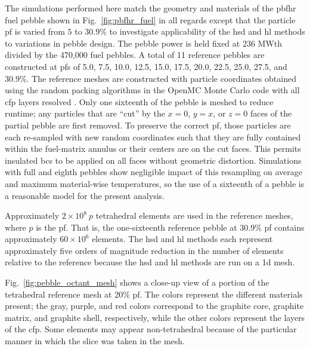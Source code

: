 The simulations performed here match the geometry and materials of the \gls{pbfhr} fuel pebble shown in Fig.\ \ref{fig:pbfhr_fuel} in all regards except that the particle \gls{pf} is varied from \(5\) to \(30.9\)\% to investigate applicability of the \gls{hsd} and \gls{hl} methods to variations in pebble design. The pebble power is held fixed at 236 MWth divided by the 470,000 fuel pebbles. A total of 11 reference pebbles are constructed at \glspl{pf} of 5.0, 7.5, 10.0, 12.5, 15.0, 17.5, 20.0, 22.5, 25.0, 27.5, and 30.9\%. The reference meshes are constructed with particle coordinates obtained using the random packing algorithms in the OpenMC Monte Carlo code with all \gls{cfp} layers resolved \cite{jodrey}. Only one sixteenth of the pebble is meshed to reduce runtime; any particles that are ``cut'' by the \(x=0\), \(y=x\), or \(z=0\) faces of the partial pebble are first removed. To preserve the correct \gls{pf}, those particles are each re-sampled with new random coordinates such that they are fully contained within the fuel-matrix annulus or their centers are on the cut faces. This permits insulated \glspl{bc} to be applied on all faces without geometric distortion. Simulations with full and eighth pebbles show negligible impact of this resampling on average and maximum material-wise temperatures, so the use of a sixteenth of a pebble is a reasonable model for the present analysis. 

Approximately \(2\times10^8\ p\) tetrahedral elements are used in the reference meshes, where \(p\) is the \gls{pf}. That is, the one-sixteenth reference pebble at 30.9\% \gls{pf} contains approximately \(60\times10^6\) elements. The \gls{hsd} and \gls{hl} methods each represent approximately five orders of magnitude reduction in the number of elements relative to the reference because the \gls{hsd} and \gls{hl} methods are run on a \gls{1d} mesh.

Fig.\ \ref{fig:pebble_octant_mesh} shows a close-up view of a portion of the tetrahedral reference mesh at 20\% \gls{pf}. The colors represent the different materials present; the gray, purple, and red colors correspond to the graphite core, graphite matrix, and graphite shell, respectively, while the other colors represent the layers of the \gls{cfp}. Some elements may appear non-tetrahedral because of the particular manner in which the slice was taken in the mesh.

